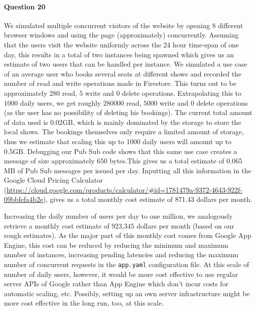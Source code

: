 \documentclass{ds-report}
\begin{document}
	\paragraph{Question 20} 
	We simulated multiple concurrent visitors of the website by opening 8 different browser windows and using the page (approximately) concurrently.  Assuming that the users visit the website uniformly across the 24 hour time-span of one day, this results in a total of two instances being spawned which gives us an estimate of two users that can be handled per instance.
	We simulated a use case of an average user who books several seats at different shows and recorded the number of read and write operations made in Firestore. This turns out to be approximately $280$ read, $5$ write and $0$ delete operations. Extrapolating this to $1000$ daily users, we get roughly $280 000$ read, $5000$ write and $0$ delete operations (as the user has no possibility of deleting his bookings). The current total amount of data used is 0.02GB, which is mainly dominated by the storage to store the local shows. The bookings themselves only require a limited amount of storage, thus we estimate that scaling this up to 1000 daily users will amount up to 0.5GB. Debugging our Pub Sub code shows that this same use case creates a message of size approximately $650$ bytes.This gives us a total estimate of 0.065 MB of Pub Sub messages per issued per day. Inputting all this information in the Google Cloud Pricing Calculator (\url{https://cloud.google.com/products/calculator/#id=1781479a-9372-4643-922f-09bbfefa4b2e}), gives us a total monthly cost estimate of 871.43 dollars per month.
	
	Increasing the daily number of users per day to one million, we analogously retrieve a monthly cost estimate of 923,345 dollars per month (based on our rough estimates). As the major part of this monthly cost comes from Google App Engine, this cost can be reduced by reducing the minimum and maximum number of instances, increasing pending latencies and reducing the maximum number of concurrent requests in the \texttt{app.yaml} configuration file. At this scale of number of daily users, however, it would be more cost effective to use regular server APIs of Google rather than App Engine which don't incur costs for automatic scaling, etc. Possibly, setting up an own server infrastructure might be more cost effective in the long run, too, at this scale.
	
	\clearpage
	
	
\end{document}
